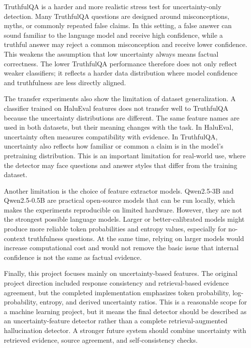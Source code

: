 \documentclass[11pt]{article}
\begin{document}
TruthfulQA is a harder and more realistic stress test for uncertainty-only detection. Many TruthfulQA questions are designed around misconceptions, myths, or commonly repeated false claims. In this setting, a false answer can sound familiar to the language model and receive high confidence, while a truthful answer may reject a common misconception and receive lower confidence. This weakens the assumption that low uncertainty always means factual correctness. The lower TruthfulQA performance therefore does not only reflect weaker classifiers; it reflects a harder data distribution where model confidence and truthfulness are less directly aligned.

The transfer experiments also show the limitation of dataset generalization. A classifier trained on HaluEval features does not transfer well to TruthfulQA because the uncertainty distributions are different. The same feature names are used in both datasets, but their meaning changes with the task. In HaluEval, uncertainty often measures compatibility with evidence. In TruthfulQA, uncertainty also reflects how familiar or common a claim is in the model's pretraining distribution. This is an important limitation for real-world use, where the detector may face questions and answer styles that differ from the training dataset.

Another limitation is the choice of feature extractor models. Qwen2.5-3B and Qwen2.5-0.5B are practical open-source models that can be run locally, which makes the experiments reproducible on limited hardware. However, they are not the strongest possible language models. Larger or better-calibrated models might produce more reliable token probabilities and entropy values, especially for no-context truthfulness questions. At the same time, relying on larger models would increase computational cost and would not remove the basic issue that internal confidence is not the same as factual evidence.

Finally, this project focuses mainly on uncertainty-based features. The original project direction included response consistency and retrieval-based evidence agreement, but the completed implementation emphasizes token probability, log-probability, entropy, and derived uncertainty ratios. This is a reasonable scope for a machine learning project, but it means the final detector should be described as an uncertainty-feature detector rather than a complete retrieval-augmented hallucination detector. A stronger future system should combine uncertainty with retrieved evidence, source agreement, and self-consistency checks.
\end{document}
